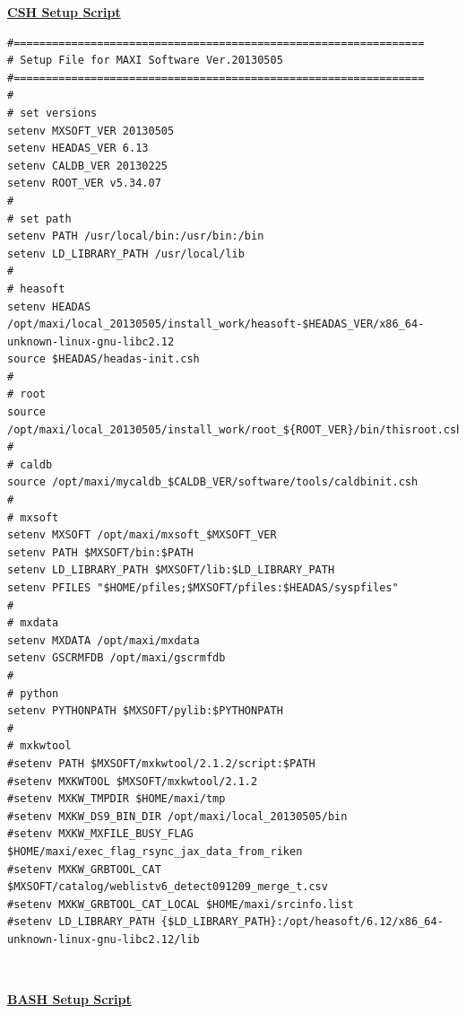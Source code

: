 \documentclass[10pt]{report}
\renewcommand{\_}{\textscale{.5}{\textbf{\textunderscore}}}
\begin{document}
\noindent\underline{\textbf{CSH Setup Script}}\\

\begin{lstlisting}[basicstyle=\ttfamily\small]
#================================================================
# Setup File for MAXI Software Ver.20130505
#================================================================
#
# set versions
setenv MXSOFT_VER 20130505
setenv HEADAS_VER 6.13
setenv CALDB_VER 20130225
setenv ROOT_VER v5.34.07
#
# set path
setenv PATH /usr/local/bin:/usr/bin:/bin
setenv LD_LIBRARY_PATH /usr/local/lib
#
# heasoft
setenv HEADAS /opt/maxi/local_20130505/install_work/heasoft-$HEADAS_VER/x86_64-unknown-linux-gnu-libc2.12
source $HEADAS/headas-init.csh
#
# root
source /opt/maxi/local_20130505/install_work/root_${ROOT_VER}/bin/thisroot.csh
#
# caldb
source /opt/maxi/mycaldb_$CALDB_VER/software/tools/caldbinit.csh
#
# mxsoft
setenv MXSOFT /opt/maxi/mxsoft_$MXSOFT_VER
setenv PATH $MXSOFT/bin:$PATH
setenv LD_LIBRARY_PATH $MXSOFT/lib:$LD_LIBRARY_PATH
setenv PFILES "$HOME/pfiles;$MXSOFT/pfiles:$HEADAS/syspfiles"
#
# mxdata
setenv MXDATA /opt/maxi/mxdata
setenv GSCRMFDB /opt/maxi/gscrmfdb
#
# python
setenv PYTHONPATH $MXSOFT/pylib:$PYTHONPATH
#
# mxkwtool
#setenv PATH $MXSOFT/mxkwtool/2.1.2/script:$PATH
#setenv MXKWTOOL $MXSOFT/mxkwtool/2.1.2
#setenv MXKW_TMPDIR $HOME/maxi/tmp
#setenv MXKW_DS9_BIN_DIR /opt/maxi/local_20130505/bin
#setenv MXKW_MXFILE_BUSY_FLAG $HOME/maxi/exec_flag_rsync_jax_data_from_riken
#setenv MXKW_GRBTOOL_CAT $MXSOFT/catalog/weblistv6_detect091209_merge_t.csv
#setenv MXKW_GRBTOOL_CAT_LOCAL $HOME/maxi/srcinfo.list
#setenv LD_LIBRARY_PATH {$LD_LIBRARY_PATH}:/opt/heasoft/6.12/x86_64-unknown-linux-gnu-libc2.12/lib
\end{lstlisting}

\

\noindent\underline{\textbf{BASH Setup Script}}\\
\end{document}

